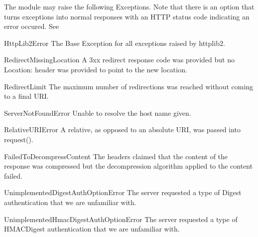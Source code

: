 
The  module may raise the following Exceptions. Note that 
there is an option that turns exceptions into 
normal responses with an HTTP status code indicating
an error occured. See 

\begin{excdesc}{HttpLib2Error}
The Base Exception for all exceptions raised by httplib2.
\end{excdesc}

\begin{excdesc}{RedirectMissingLocation}
A 3xx redirect response code was provided but no Location: header 
was provided to point to the new location.
\end{excdesc}

\begin{excdesc}{RedirectLimit}
The maximum number of redirections was reached without coming to a final URI.
\end{excdesc}


\begin{excdesc}{ServerNotFoundError}
Unable to resolve the host name given.
\end{excdesc}

\begin{excdesc}{RelativeURIError}
A relative, as opposed to an absolute URI, was passed into request().
\end{excdesc}

\begin{excdesc}{FailedToDecompressContent}
The headers claimed that the content of the response was compressed but the
decompression algorithm applied to the content failed.
\end{excdesc}

\begin{excdesc}{UnimplementedDigestAuthOptionError}
The server requested a type of Digest authentication that we
are unfamiliar with.
\end{excdesc}

\begin{excdesc}{UnimplementedHmacDigestAuthOptionError}
The server requested a type of HMACDigest authentication that we
are unfamiliar with.
\end{excdesc}


